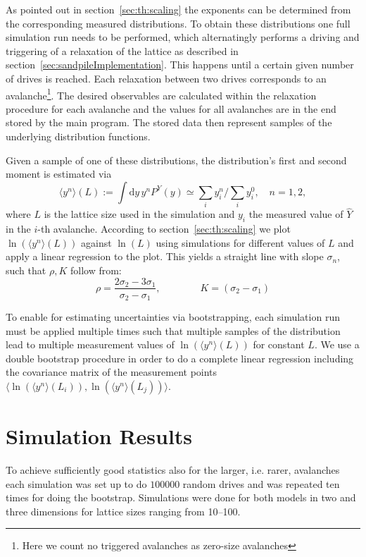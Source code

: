 As pointed out in section~\ref{sec:th:scaling} the exponents can be determined from the corresponding measured
distributions. To obtain these distributions one full simulation run needs to be performed, which alternatingly performs
a driving and triggering of a relaxation of the lattice as described in section~\ref{sec:sandpileImplementation}.
This happens until a certain given number of drives is reached. Each relaxation between two drives corresponds to an
avalanche\footnote{Here we count no triggered avalanches as zero-size avalanches}. The desired observables are
calculated within the relaxation procedure for each avalanche and the values for all avalanches are in the end stored
by the main program. The stored data then represent samples of the underlying distribution functions.

Given a sample of one of these distributions, the distribution's first and second moment is estimated via
\begin{equation}
\langle y^n\rangle(L) := \int\!\mathrm{d}y\, y^n P^{Y}(y) \simeq \sum_i y_i^n \Big/ \sum_i y_i^0,\quad n=1,2,
\end{equation}
where $L$ is the lattice size used in the simulation and $y_i$ the measured value of $\hat{Y}$ in the $i$-th avalanche.
According to section~\ref{sec:th:scaling} we plot $\ln\left(\langle y^n\rangle(L)\right)$ against $\ln\left(L\right)$
using simulations for different values of $L$ and apply a linear regression to the plot. This yields a straight line
with slope $\sigma_n$, such that $\rho, K$ follow from:
\begin{equation}
\rho = \frac{2\sigma_2 - 3\sigma_1}{\sigma_2 - \sigma_1}, \qquad\qquad K = (\sigma_2-\sigma_1)
\end{equation}

To enable for estimating uncertainties via bootstrapping, each simulation run must be applied multiple times such that
multiple samples of the distribution lead to multiple measurement values of $\ln\left(\langle y^n\rangle(L)\right)$
for constant $L$. We use a double bootstrap procedure in order to do a complete linear regression
including the covariance matrix of the measurement points
$\langle\ln\left(\langle y^n\rangle(L_i)\right), \ln\left(\langle y^n\rangle(L_j)\right)\rangle$.


\section{Simulation Results}
\label{sec:results}
To achieve sufficiently good statistics also for the larger, i.e. rarer, avalanches each simulation was set up to
do $100000$ random drives and was repeated ten times for doing the bootstrap. Simulations were done for both models
in two and three dimensions for lattice sizes ranging from \SIrange{10}{100}{}.

